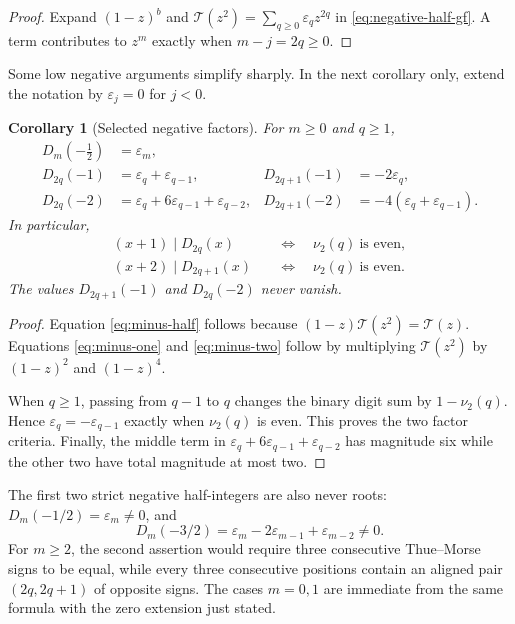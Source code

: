 \documentclass[11pt,oneside]{article}
\newtheorem{corollary}[theorem]{Corollary}
\theoremstyle{definition}
\theoremstyle{remark}
\newcommand{\eps}{\varepsilon}
\newcommand{\Diag}{D}
\newcommand{\TM}{\mathcal T}
\newcommand{\vtwo}{\nu_{2}}
\begin{document}
\begin{proof}
Expand $(1-z)^b$ and
$\TM(z^2)=\sum_{q\ge0}\eps_qz^{2q}$ in
\eqref{eq:negative-half-gf}.  A term contributes to $z^m$ exactly when
$m-j=2q\ge0$.
\end{proof}

Some low negative arguments simplify sharply.  In the next corollary only,
extend the notation by $\eps_j=0$ for $j<0$.

\begin{corollary}[Selected negative factors]
\label{cor:negative-factors}
For $m\ge0$ and $q\ge1$,
\begin{align}
 \Diag_m\!\left(-\frac12\right)&=\eps_m,
 \label{eq:minus-half}\\
 \Diag_{2q}(-1)&=\eps_q+\eps_{q-1},
 &\Diag_{2q+1}(-1)&=-2\eps_q,
 \label{eq:minus-one}\\
 \Diag_{2q}(-2)&=\eps_q+6\eps_{q-1}+\eps_{q-2},
 &\Diag_{2q+1}(-2)&=-4(\eps_q+\eps_{q-1}).
 \label{eq:minus-two}
\end{align}
In particular,
\begin{align}
 (x+1)\mid\Diag_{2q}(x)
 &\quad\Longleftrightarrow\quad \vtwo(q)\ \text{is even},
 \label{eq:xplus1}\\
 (x+2)\mid\Diag_{2q+1}(x)
 &\quad\Longleftrightarrow\quad \vtwo(q)\ \text{is even}.
 \label{eq:xplus2}
\end{align}
The values $\Diag_{2q+1}(-1)$ and $\Diag_{2q}(-2)$ never vanish.
\end{corollary}

\begin{proof}
Equation \eqref{eq:minus-half} follows because
$(1-z)\TM(z^2)=\TM(z)$.  Equations \eqref{eq:minus-one} and
\eqref{eq:minus-two} follow by multiplying $\TM(z^2)$ by
$(1-z)^2$ and $(1-z)^4$.

When $q\ge1$, passing from $q-1$ to $q$ changes the binary digit sum by
$1-\vtwo(q)$.  Hence
$\eps_q=-\eps_{q-1}$ exactly when $\vtwo(q)$ is even.  This proves the two
factor criteria.  Finally, the middle term in
$\eps_q+6\eps_{q-1}+\eps_{q-2}$ has magnitude six while the other two have
total magnitude at most two.
\end{proof}

The first two strict negative half-integers are also never roots:
$\Diag_m(-1/2)=\eps_m\ne0$, and
\[
 \Diag_m(-3/2)=\eps_m-2\eps_{m-1}+\eps_{m-2}\ne0.
\]
For $m\ge2$, the second assertion would require three consecutive
Thue--Morse signs to be equal, while every three consecutive positions
contain an aligned pair $(2q,2q+1)$ of opposite signs.  The cases $m=0,1$
are immediate from the same formula with the zero extension just stated.
\end{document}
